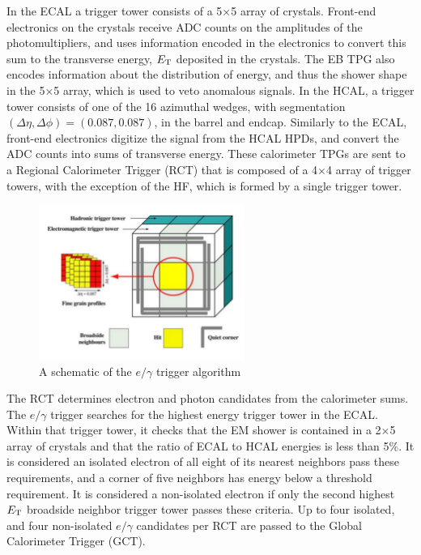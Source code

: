 \par In the ECAL a trigger tower consists of a 5$\times$5 array
of crystals.  Front-end electronics on the crystals receive ADC counts
on the amplitudes of the photomultipliers, and uses information
encoded in the electronics to convert this sum to the transverse
energy, $E_{\mathrm{T}}$ deposited in the crystals.  The EB TPG also encodes
information about the distribution of energy, and thus the shower
shape in the 5$\times$5 array, which is used to veto anomalous
signals.  In the HCAL, a trigger tower consists of one of the 16
azimuthal wedges, with segmentation $(\Delta\eta, \Delta\phi) =
(0.087, 0.087)$, in the barrel and endcap.  Similarly to the ECAL,
front-end electronics digitize the signal from the HCAL HPDs, and
convert the ADC counts into sums of transverse energy.  These
calorimeter TPGs are sent to a Regional Calorimeter Trigger (RCT) that
is composed of a 4$\times$4 array of trigger towers, with the
exception of the HF, which is formed by a single trigger tower.

\begin{figure}[h]
   \centering
  \includegraphics[width=0.6\textwidth]{Figures/CMS_Diagrams/Trigger__RCT_schematic.pdf}
  \caption{A schematic of the $e/\gamma$ trigger algorithm} \label{fig:tigger_rct_algo}
\end{figure}

\par The RCT determines electron and photon candidates from the
calorimeter sums.  The $e/\gamma$ trigger searches for the highest
energy trigger tower in the ECAL.  Within that trigger tower, it
checks that the EM shower is contained in a 2$\times$5 array of crystals
and that the ratio of ECAL to HCAL energies is less than 5$\%$.  It is
considered an isolated electron of all eight of its nearest neighbors
pass these requirements, and a corner of five neighbors has energy
below a threshold requirement.  It is considered a non-isolated
electron if only the second highest $E_{\mathrm{T}}$ broadside neighbor trigger
tower passes these criteria.  Up to four isolated, and four
non-isolated $e/\gamma$ candidates per RCT are passed to the Global
Calorimeter Trigger (GCT).  

